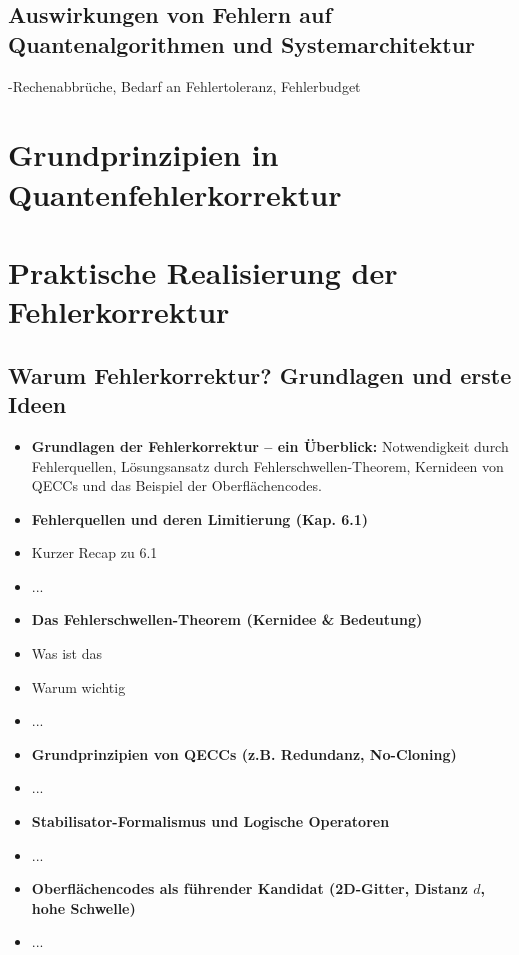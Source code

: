 \subsection{Auswirkungen von Fehlern auf Quantenalgorithmen und Systemarchitektur}
{-Rechenabbrüche, Bedarf an Fehlertoleranz, Fehlerbudget}




\section{Grundprinzipien in Quantenfehlerkorrektur}

\section{Praktische Realisierung der Fehlerkorrektur}

\subsection{Warum Fehlerkorrektur? Grundlagen und erste Ideen}
\begin{itemize}
    \item \textbf{Grundlagen der Fehlerkorrektur -- ein Überblick:} Notwendigkeit durch Fehlerquellen, Lösungsansatz durch Fehlerschwellen-Theorem, Kernideen von QECCs und das Beispiel der Oberflächencodes.
    \item \textbf{Fehlerquellen und deren Limitierung (Kap. 6.1)}
    \item Kurzer Recap zu 6.1
    \item ...
    \item \textbf{Das Fehlerschwellen-Theorem (Kernidee \& Bedeutung)}
    \item Was ist das
    \item Warum wichtig
    \item ...
    \item \textbf{Grundprinzipien von QECCs (z.B. Redundanz, No-Cloning)}
    \item ...
    \item \textbf{Stabilisator-Formalismus und Logische Operatoren}
    \item ...
    \item \textbf{Oberflächencodes als führender Kandidat (2D-Gitter, Distanz $d$, hohe Schwelle)}
    \item ...
\end{itemize}

